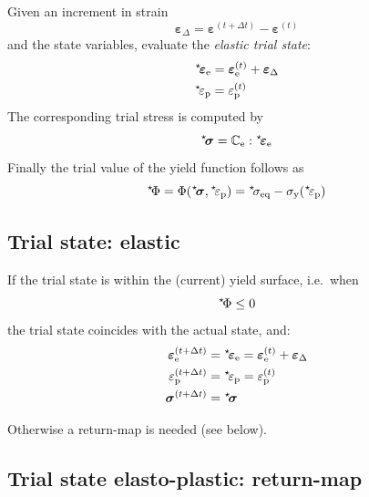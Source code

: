 \documentclass[times,namecite]{goose-article}
\newcommand\leftstar[1]{\hspace*{-.3em}~^\star\!#1}
\begin{document}
Given an increment in strain
\begin{equation}
  \bm{\varepsilon}_\Delta
  = \bm{\varepsilon}^{(t+\Delta t)} - \bm{\varepsilon}^{(t)}
\end{equation}
and the state variables, evaluate the \emph{elastic trial state}:
\begin{align}
  \leftstar{\bm{\varepsilon}}_\mathrm{e}
  &= \bm{\varepsilon}_\mathrm{e}^{(t)} + \bm{\varepsilon}_\Delta
  \\
  \leftstar{\varepsilon}_\mathrm{p}
  &= \varepsilon_\mathrm{p}^{(t)}
\end{align}
The corresponding trial stress is computed by
\begin{equation}
  \leftstar{\bm{\sigma}}
  = \mathbb{C}_\mathrm{e} : \leftstar{\bm{\varepsilon}}_\mathrm{e}
\end{equation}
Finally the trial value of the yield function follows as
\begin{equation}
  \leftstar{\Phi}
  = \Phi( \leftstar{\bm{\sigma}} , \leftstar{\varepsilon}_\mathrm{p} )
  = \leftstar{\sigma}_\mathrm{eq}
  - \sigma_\mathrm{y} (\leftstar{\varepsilon}_\mathrm{p})
\end{equation}

\subsection{Trial state: elastic}

If the trial state is within the (current) yield surface, i.e.\ when
\begin{equation}
  \leftstar{\Phi} \leq 0
\end{equation}
the trial state coincides with the actual state, and:
\begin{align}
  \bm{\varepsilon}_\mathrm{e}^{(t+\Delta t)}
  &= \leftstar{\bm{\varepsilon}}_\mathrm{e}
   = \bm{\varepsilon}_\mathrm{e}^{(t)} + \bm{\varepsilon}_\Delta
  \\
  \varepsilon_\mathrm{p}^{(t+\Delta t)}
  &= \leftstar{\varepsilon}_\mathrm{p}
   = \varepsilon_\mathrm{p}^{(t)}
  \\
  \bm{\sigma}^{(t+\Delta t)}
  &= \leftstar{\bm{\sigma}}
\end{align}

Otherwise a return-map is needed (see below).

\subsection{Trial state elasto-plastic: return-map}
\end{document}
